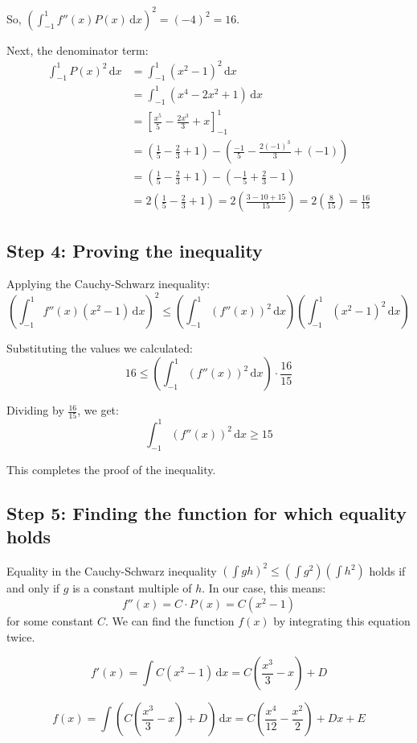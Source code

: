 \documentclass[12pt,a4paper]{article}
\theoremstyle{definition}
\begin{document}
So, $\left(\int_{-1}^{1} f''(x)P(x)\,\mathrm{d}x\right)^2 = (-4)^2 = 16$.

Next, the denominator term:
\begin{align*}
\int_{-1}^{1} P(x)^2\,\mathrm{d}x &= \int_{-1}^{1} (x^2-1)^2\,\mathrm{d}x \\
&= \int_{-1}^{1} (x^4 - 2x^2 + 1)\,\mathrm{d}x \\
&= \left[\frac{x^5}{5} - \frac{2x^3}{3} + x\right]_{-1}^{1} \\
&= \left(\frac{1}{5} - \frac{2}{3} + 1\right) - \left(\frac{-1}{5} - \frac{2(-1)^3}{3} + (-1)\right) \\
&= \left(\frac{1}{5} - \frac{2}{3} + 1\right) - \left(-\frac{1}{5} + \frac{2}{3} - 1\right) \\
&= 2\left(\frac{1}{5} - \frac{2}{3} + 1\right) = 2\left(\frac{3 - 10 + 15}{15}\right) = 2\left(\frac{8}{15}\right) = \frac{16}{15}
\end{align*}

\subsection*{Step 4: Proving the inequality}
Applying the Cauchy-Schwarz inequality:
\[ \left(\int_{-1}^{1} f''(x)(x^2-1)\,\mathrm{d}x\right)^2 \leq \left(\int_{-1}^{1} (f''(x))^2\,\mathrm{d}x\right) \left(\int_{-1}^{1} (x^2-1)^2\,\mathrm{d}x\right) \]

Substituting the values we calculated:
\[ 16 \leq \left(\int_{-1}^{1} (f''(x))^2\,\mathrm{d}x\right) \cdot \frac{16}{15} \]

Dividing by $\frac{16}{15}$, we get:
\[ \int_{-1}^{1} (f''(x))^2\,\mathrm{d}x \geq 15 \]

This completes the proof of the inequality.

\subsection*{Step 5: Finding the function for which equality holds}
Equality in the Cauchy-Schwarz inequality $(\int gh)^2 \leq (\int g^2)(\int h^2)$ holds if and only if $g$ is a constant multiple of $h$. In our case, this means:
\[ f''(x) = C \cdot P(x) = C(x^2 - 1) \]
for some constant $C$. We can find the function $f(x)$ by integrating this equation twice.

\[ f'(x) = \int C(x^2 - 1)\,\mathrm{d}x = C\left(\frac{x^3}{3} - x\right) + D \]

\[ f(x) = \int \left(C\left(\frac{x^3}{3} - x\right) + D\right)\,\mathrm{d}x = C\left(\frac{x^4}{12} - \frac{x^2}{2}\right) + Dx + E \]
\end{document}
